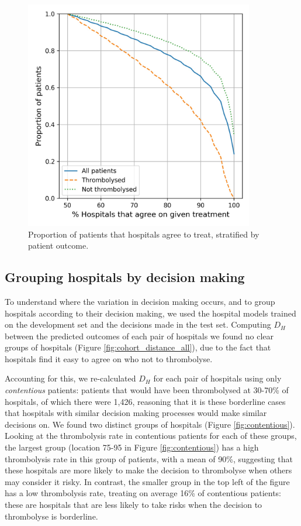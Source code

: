 \documentclass[12pt,a4paper, pdftex]{elsarticle}
\begin{document}
\begin{figure}[ht!]
\centering
\includegraphics[width=10cm]{figures/agreement_x_hospital_single.jpg}
\caption{Proportion of patients that hospitals agree to treat, stratified by patient outcome.}
\label{fig:aggree}
\end{figure}

\subsection{Grouping hospitals by decision making}

To understand where the variation in decision making occurs, and to group hospitals according to their decision making, we used the hospital models trained on the development set and the decisions made in the test set. Computing $D_H$ between the predicted outcomes of each pair of hospitals we found no clear groups of hospitals (Figure \ref{fig:cohort_distance_all}), due to the fact that hospitals find it easy to agree on who not to thrombolyse. 

Accounting for this, we re-calculated $D_H$ for each pair of hospitals using only {\it contentious} patients: patients that would have been thrombolysed at 30-70\% of hospitals, of which there were 1,426, reasoning that it is these borderline cases that hospitals with similar decision making processes would make similar decisions on. We found two distinct groups of hospitals (Figure \ref{fig:contentious}). Looking at the thrombolysis rate in contentious patients for each of these groups, the largest group (location 75-95 in Figure \ref{fig:contentious}) has a high thrombolysis rate in this group of patients, with a mean of 90\%, suggesting that these hospitals are more likely to make the decision to thrombolyse when others may consider it risky. 
In contrast, the smaller group in the top left of the figure has a low thrombolysis rate, treating on average 16\% of contentious patients: these are hospitals that are less likely to take risks when the decision to thrombolyse is borderline. 
\end{document}
